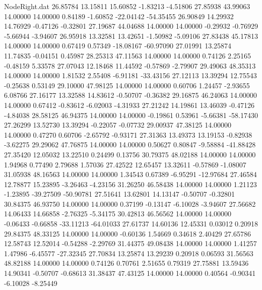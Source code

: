 \begin{filecontents}{NodeRight.dat}
  26.85784   13.15811   15.60852    -1.83213   -4.51806   27.85938   43.99063   14.00000   14.00000    0.84189   -1.60852  -22.04142  -54.35455
  26.90849   14.29932   14.76929    -0.47126   -0.32801   27.19687   44.04688   14.00000   14.00000   -0.29932   -0.76929   -5.66944   -3.94607
  26.95918   13.32581   13.42651    -1.50982   -5.09106   27.83438   45.17813   14.00000   14.00000    0.67419    0.57349  -18.08167  -60.97090
  27.01991   13.25874   11.74835    -0.04151    0.45987   28.25313   47.11563   14.00000   14.00000    0.74126    2.25165   -0.48159    5.33578
  27.07043   12.18468   11.44592    -0.57869   -2.79907   29.49063   48.35313   14.00000   14.00000    1.81532    2.55408   -6.91181  -33.43156
  27.12113   13.39294   12.75543    -0.25638    0.53149   29.10000   47.98125   14.00000   14.00000    0.60706    1.24457   -2.93655    6.08766
  27.16177   13.32588   14.83612    -0.50707   -0.36382   29.16875   46.24063   14.00000   14.00000    0.67412   -0.83612   -6.02003   -4.31933
  27.21242   14.19861   13.46039    -0.47126   -4.84038   28.58125   46.94375   14.00000   14.00000   -0.19861    0.53961   -5.66381  -58.17430
  27.26299   13.52730   13.39294    -0.22057   -0.07732   29.00937   47.38125   14.00000   14.00000    0.47270    0.60706   -2.65792   -0.93171
  27.31363   13.49373   13.19153    -0.82938   -3.62275   29.29062   47.76875   14.00000   14.00000    0.50627    0.80847   -9.58884  -41.88428
  27.35420   12.05032   13.22510     0.24499    0.13756   30.79375   48.02188   14.00000   14.00000    1.94968    0.77490    2.79688    1.57036
  27.42522   12.65457   13.32611    -0.57869   -1.08007   31.05938   48.16563   14.00000   14.00000    1.34543    0.67389   -6.95291  -12.97684
  27.46584   12.78877   15.23895    -3.26463   -4.23156   31.26250   46.58438   14.00000   14.00000    1.21123   -1.23895  -39.27509  -50.90781
  27.51641   13.62801   14.13147    -0.50707   -0.32801   30.84375   46.93750   14.00000   14.00000    0.37199   -0.13147   -6.10028   -3.94607
  27.56682   14.06433   14.66858    -2.76325   -5.34175   30.42813   46.56562   14.00000   14.00000   -0.06433   -0.66858  -33.11213  -64.01033
  27.61737   14.60136   12.45331     0.03012    0.20918   29.84375   48.33125   14.00000   14.00000   -0.60136    1.54669    0.34618    2.40429
  27.65786   12.58743   12.52014    -0.54288   -2.29769   31.44375   49.08438   14.00000   14.00000    1.41257    1.47986   -6.45577  -27.32345
  27.70834   13.25874   13.29239     0.20918    0.06593   31.56563   48.82188   14.00000   14.00000    0.74126    0.70761    2.51655    0.79319
  27.75881   13.59436   14.90341    -0.50707   -0.68613   31.38437   47.43125   14.00000   14.00000    0.40564   -0.90341   -6.10028   -8.25449

\end{filecontents}
